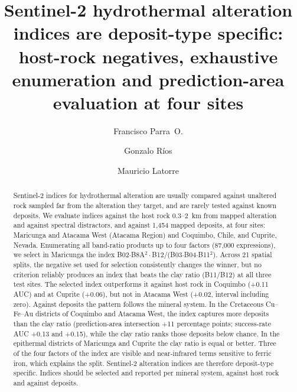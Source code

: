 \documentclass[preprint,authoryear,number]{elsarticle}
\begin{document}
\begin{frontmatter}


\title{Sentinel-2 hydrothermal alteration indices are deposit-type specific: host-rock negatives, exhaustive enumeration and prediction-area evaluation at four sites}

\author[usach]{Francisco Parra~O.}
\author[dim]{Gonzalo R\'ios}
\author[uoh,systemix,cgr,cmm,inta]{Mauricio Latorre}

\address[usach]{Universidad de Santiago de Chile (USACH), Santiago, Chile}
\address[dim]{Departamento de Ingenier\'ia Matem\'atica, Facultad de Ciencias F\'isicas y Matem\'aticas, Universidad de Chile, Santiago, Chile}
\address[uoh]{Laboratorio de Bioingenier\'ia, Instituto de Ciencias de la Ingenier\'ia, Universidad de O'Higgins, Libertador Bernardo O'Higgins 611, Rancagua, Chile}
\address[systemix]{Centro de Biolog\'ia de Sistemas para el Estudio de Comunidades Extrem\'ofilas de Relaves Mineros (SYSTEMIX), Universidad de O'Higgins, Rancagua, Chile}
\address[cgr]{Millennium Institute Center for Genome Regulation, Santiago 8320165, Chile}
\address[cmm]{Center for Mathematical Modeling, University of Chile, Beauchef 851, Santiago, Chile}
\address[inta]{Laboratorio de Bioinform\'atica y Expresi\'on G\'enica, INTA, Universidad de Chile, El L\'ibano 5524, Macul, Santiago, Chile}


\begin{abstract}
Sentinel-2 indices for hydrothermal alteration are usually compared against unaltered rock sampled far from the alteration they target, and are rarely tested against known deposits. We evaluate indices against the host rock 0.3--2~km from mapped alteration and against spectral distractors, and against 1{,}454 mapped deposits, at four sites: Maricunga and Atacama West (Atacama Region) and Coquimbo, Chile, and Cuprite, Nevada. Enumerating all band-ratio products up to four factors (87{,}000 expressions), we select in Maricunga the index B02$\cdot$B8A$^2\cdot$B12/(B03$\cdot$B04$\cdot$B11$^2$). Across 21 spatial splits, the negative set used for selection consistently changes the winner, but no criterion reliably produces an index that beats the clay ratio (B11/B12) at all three test sites. The selected index outperforms it against host rock in Coquimbo (+0.11 AUC) and at Cuprite (+0.06), but not in Atacama West (+0.02, interval including zero). Against deposits the pattern follows the mineral system. In the Cretaceous Cu--Fe--Au districts of Coquimbo and Atacama West, the index captures more deposits than the clay ratio (prediction-area intersection +11 percentage points; success-rate AUC +0.13 and +0.15), while the clay ratio ranks those deposits below chance. In the epithermal districts of Maricunga and Cuprite the clay ratio is equal or better. Three of the four factors of the index are visible and near-infrared terms sensitive to ferric iron, which explains the split. Sentinel-2 alteration indices are therefore deposit-type specific. Indices should be selected and reported per mineral system, against host rock and against deposits.
\end{abstract}


\end{frontmatter}
\end{document}
